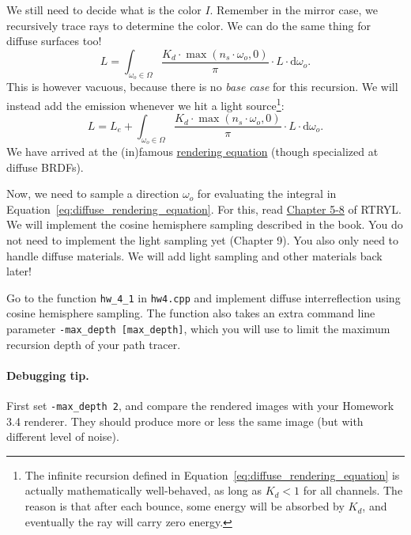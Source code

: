 We still need to decide what is the color $I$. Remember in the mirror case, we recursively trace rays to determine the color. We can do the same thing for diffuse surfaces too!
\begin{equation}
L = \int_{\omega_o \in \Omega} \frac{K_d \cdot \max\left(n_s \cdot \omega_o, 0\right)}{\pi} \cdot L \cdot \mathrm{d}\omega_o.
\end{equation}
This is however vacuous, because there is no \emph{base case} for this recursion. We will instead add the emission whenever we hit a light source\footnote{The infinite recursion defined in Equation~\eqref{eq:diffuse_rendering_equation} is actually mathematically well-behaved, as long as $K_d < 1$ for all channels. The reason is that after each bounce, some energy will be absorbed by $K_d$, and eventually the ray will carry zero energy.}:
\begin{equation}
L = L_e + \int_{\omega_o \in \Omega} \frac{K_d \cdot \max\left(n_s \cdot \omega_o, 0\right)}{\pi} \cdot L \cdot \mathrm{d}\omega_o.
\label{eq:diffuse_rendering_equation}
\end{equation}
We have arrived at the (in)famous \href{https://en.wikipedia.org/wiki/Rendering_equation}{rendering equation} (though specialized at diffuse BRDFs).

Now, we need to sample a direction $\omega_o$ for evaluating the integral in Equation~\eqref{eq:diffuse_rendering_equation}. For this, read \href{https://raytracing.github.io/books/RayTracingTheRestOfYourLife.html#lightscattering}{Chapter 5-8} of RTRYL. We will implement the cosine hemisphere sampling described in the book. You do not need to implement the light sampling yet (Chapter 9). You also only need to handle diffuse materials. We will add light sampling and other materials back later!

Go to the function \lstinline{hw_4_1} in \lstinline{hw4.cpp} and implement diffuse interreflection using cosine hemisphere sampling. The function also takes an extra command line parameter \lstinline{-max_depth [max_depth]}, which you will use to limit the maximum recursion depth of your path tracer. 

\paragraph{Debugging tip.} First set \lstinline{-max_depth 2}, and compare the rendered images with your Homework 3.4 renderer. They should produce more or less the same image (but with different level of noise).  

